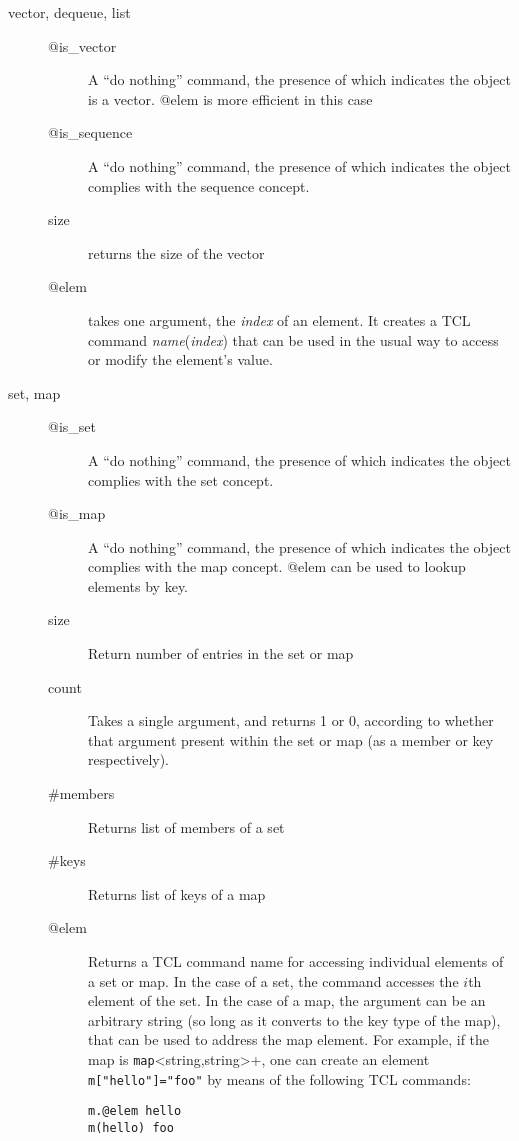 \begin{description}
\item[vector, dequeue, list]\mbox{}
  \begin{description}
  \item[@is\_vector] A ``do nothing'' command, the presence of which
    indicates the object is a vector. @elem is more efficient in this case
  \item[@is\_sequence] A ``do nothing'' command, the presence of which
    indicates the object complies with the sequence concept.
  \item[size] returns the size of the vector
  \item[@elem] takes one argument, the {\em index} of an element. It creates a
    TCL command {\em name}({\em index}) that can be used in the usual
    way to access or modify the element's value.
  \end{description}

\item[set, map]\mbox{}
  \begin{description}
  \item[@is\_set] A ``do nothing'' command, the presence of which
    indicates the object complies with the set concept.
  \item[@is\_map] A ``do nothing'' command, the presence of which
    indicates the object complies with the map concept. @elem can be
    used to lookup elements by key.
  \item[size] Return number of entries in the set or map
  \item[count] Takes a single argument, and returns 1 or 0, according to
    whether that argument present within the set or map (as a member or
    key respectively).
  \item[\#members] Returns list of members of a set
  \item[\#keys] Returns list of keys of a map
  \item[@elem] Returns a TCL command name for accessing individual
    elements of a set or map. In the case of a set, the command accesses
  the $i$th element of the set. In the case of a map, the argument can
  be an arbitrary string (so long as it converts to the key type of
  the map), that can be used to address the map element. For example,
  if the map is \verb+map+<string,string>+, one can create an element
  \verb+m["hello"]="foo"+ by means of the following TCL commands:
\begin{verbatim}
m.@elem hello
m(hello) foo
\end{verbatim}
  \end{description}
\end{description}

